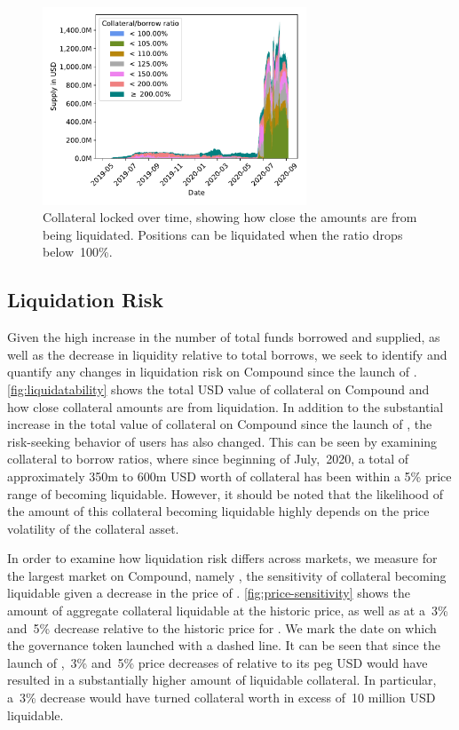 \begin{figure}[tbp]
  \centering
  \includegraphics[width=0.7\textwidth]{./5b-economic-security/figures/supply-borrow-over-time.pdf}
  \caption{Collateral locked over time, showing how close the amounts are from being liquidated. Positions can be liquidated when the ratio drops below~100\%.}
  \label{fig:liquidatability}
\end{figure}

\subsection{Liquidation Risk}
Given the high increase in the number of total funds borrowed and supplied, as well as the decrease in liquidity relative to total borrows, we seek to identify and quantify any changes in liquidation risk on Compound since the launch of . 
\autoref{fig:liquidatability} shows the total USD value of collateral on Compound and how close collateral amounts are from liquidation. 
In addition to the substantial increase in the total value of collateral on Compound since the launch of , the risk-seeking behavior of users has also changed.
This can be seen by examining collateral to borrow ratios, where since beginning of July,~2020, a total of approximately 350m to 600m USD worth of collateral has been within a 5\% price range of becoming liquidable.
However, it should be noted that the likelihood of the amount of this collateral becoming liquidable highly depends on the price volatility of the collateral asset.

In order to examine how liquidation risk differs across markets, we measure for the largest market on Compound, namely , the sensitivity of collateral becoming liquidable given a decrease in the price of .
\autoref{fig:price-sensitivity} shows the amount of aggregate collateral liquidable at the historic price, as well as at a~3\% and~5\% decrease relative to the historic price for .
We mark the date on which the  governance token launched with a dashed line.
It can be seen that since the launch of ,~3\% and~5\% price decreases of  relative to its peg USD would have resulted in a substantially higher amount of liquidable collateral.
In particular, a~3\% decrease would have turned collateral worth in excess of~10 million USD liquidable.

